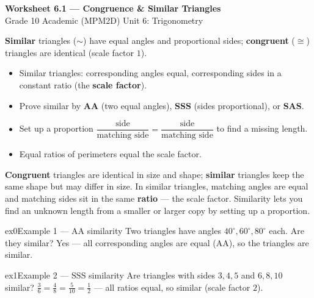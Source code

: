 \documentclass[11pt]{article}
\begin{document}
\begin{center}
{\LARGE\bfseries\color{titleblue}Worksheet 6.1 --- Congruence \& Similar Triangles}\\[2pt]
{\small Grade 10 Academic (MPM2D) \textperiodcentered{} Unit 6: Trigonometry}
\end{center}

\begin{ideabox}
\textbf{Similar} triangles ($\sim$) have equal angles and proportional sides; \textbf{congruent} ($\cong$) triangles are identical (scale factor $1$).
\begin{itemize}[leftmargin=*,itemsep=2pt]
  \item Similar triangles: corresponding angles equal, corresponding sides in a constant ratio (the \textbf{scale factor}).
  \item Prove similar by \textbf{AA} (two equal angles), \textbf{SSS} (sides proportional), or \textbf{SAS}.
  \item Set up a proportion $\dfrac{\text{side}}{\text{matching side}}=\dfrac{\text{side}}{\text{matching side}}$ to find a missing length.
  \item Equal ratios of perimeters equal the scale factor.
\end{itemize}
\end{ideabox}

\begin{learnbox}
\textbf{Congruent} triangles are identical in size and shape; \textbf{similar} triangles keep the same shape but may differ in size.
In similar triangles, matching angles are equal and matching sides sit in the same \textbf{ratio} — the scale factor.
Similarity lets you find an unknown length from a smaller or larger copy by setting up a proportion.
\end{learnbox}


\begin{example}{ex0}{Example 1 --- AA similarity}
Two triangles have angles $40^\circ,60^\circ,80^\circ$ each. Are they similar?
\soln Yes --- all corresponding angles are equal (AA), so the triangles are similar.
\end{example}

\begin{example}{ex1}{Example 2 --- SSS similarity}
Are triangles with sides $3,4,5$ and $6,8,10$ similar?
\soln $\tfrac{3}{6}=\tfrac{4}{8}=\tfrac{5}{10}=\tfrac12$ --- all ratios equal, so similar (scale factor $2$).
\end{example}
\end{document}
